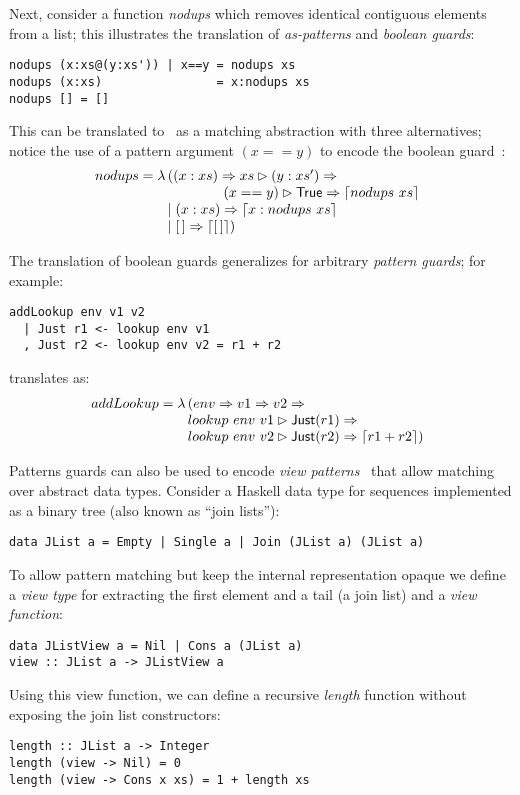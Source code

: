 Next, consider a function \emph{nodups} which removes identical contiguous elements
from a list; this illustrates the translation of 
\emph{as-patterns} and \emph{boolean guards}:
%
\begin{verbatim}
nodups (x:xs@(y:xs')) | x==y = nodups xs
nodups (x:xs)                = x:nodups xs
nodups [] = []
\end{verbatim}
%
This can be translated to \lambdaPMC\
as a matching abstraction with three alternatives;
notice the use of a pattern argument $(x==y)$ to encode the
boolean guard~\cite{kahl_2004}:
\[
  nodups = \lambda
  \!\!\begin{array}[t]{l}
    ((x:xs) \Rightarrow
    xs \rhd (y:xs') \Rightarrow \\
     \qquad\qquad (x==y) \rhd \textsf{True} \Rightarrow \left\lceil nodups~ xs\right\rceil  \\
    \mid (x:xs) \Rightarrow  \left\lceil x: nodups~xs\right\rceil \\
    \mid [\,] \Rightarrow \left\lceil [\,]\right\rceil)
  \end{array}
\]

The translation of boolean guards generalizes
for arbitrary \emph{pattern guards}; for example:
\begin{verbatim}
addLookup env v1 v2 
  | Just r1 <- lookup env v1
  , Just r2 <- lookup env v2 = r1 + r2
\end{verbatim}
%
translates as:
\[
  addLookup = \lambda \!\!\begin{array}[t]{l}
                     (env \Rightarrow v1 \Rightarrow v2 \Rightarrow \\
                     lookup~ env~ v1 \rhd \textsf{Just}(r1) \Rightarrow \\
                     lookup~ env~ v2 \rhd \textsf{Just}(r2) \Rightarrow  \left\lceil r1 + r2\right\rceil)
                     \end{array}
\]



  Patterns guards can also be used to encode
  \emph{view patterns}~\cite{wadler_1987,ghc_guide_view_patterns}
  that allow matching over abstract data types.
  Consider a Haskell data type for sequences implemented as a binary tree
  (also known as ``join lists''):
\begin{verbatim}
data JList a = Empty | Single a | Join (JList a) (JList a)
\end{verbatim}
  To allow pattern matching but keep the internal representation opaque
  we define a \emph{view type} for extracting
  the first element and a tail (a join list) and a \emph{view function}:
\begin{verbatim}
data JListView a = Nil | Cons a (JList a)
view :: JList a -> JListView a
\end{verbatim}
  Using this view function, we can define a recursive \textit{length} function
  without exposing the join list constructors:
\begin{verbatim}
length :: JList a -> Integer
length (view -> Nil) = 0
length (view -> Cons x xs) = 1 + length xs
\end{verbatim}

